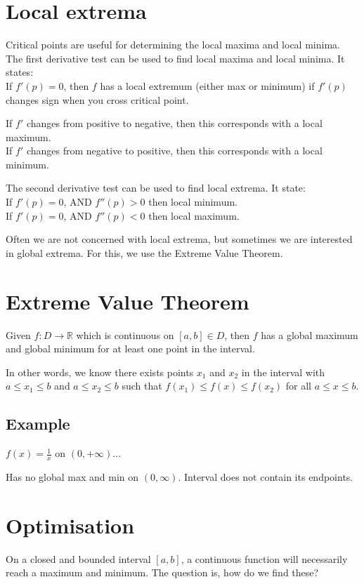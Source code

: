 \section{Local extrema}
Critical points are useful for determining the local maxima and local minima.
The first derivative test can be used to find local maxima and local minima. It
states: \\
If $f'(p) = 0$, then $f$ has a local extremum (either max or minimum) if $f'(p)$
changes sign when you cross critical point.

If $f'$ changes from positive to negative, then this corresponds with a local
maximum. \\
If $f'$ changes from negative to positive, then this corresponds with a local
minimum.

The second derivative test can be used to find local extrema. It state: \\
If $f'(p) = 0$, AND $f''(p) > 0$ then local minimum. \\
If $f'(p) = 0$, AND $f''(p) < 0$ then local maximum.

Often we are not concerned with local extrema, but sometimes we are interested
in global extrema. For this, we use the Extreme Value Theorem.

\section{Extreme Value Theorem}
Given $f: D \to \mathbb{R}$ which is continuous on $[a,b] \in D$, then $f$ has a
global maximum and global minimum for at least one point in the interval.

In other words, we know there exists points $x_1$ and $x_2$ in the interval with
$a \leq x_1 \leq b$ and $a \leq x_2 \leq b$ such that
$f(x_1) \leq f(x) \leq f(x_2)$ for all $a \leq x \leq b$.

\subsection{Example}
$f(x) = \frac{1}{x}$ on $(0, +\infty)$...


Has no global max and min on $(0, \infty)$. Interval does not contain its
endpoints.

\section{Optimisation}
On a closed and bounded interval $[a,b]$, a continuous function will necessarily
reach a maximum and minimum. The question is, how do we find these?

